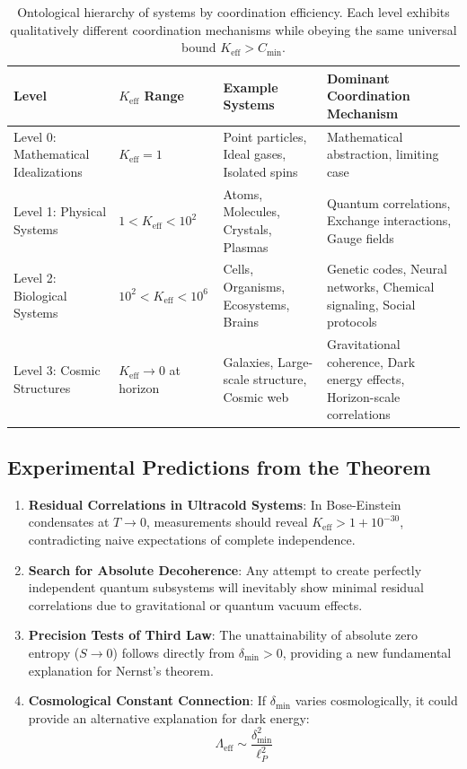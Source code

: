 \documentclass[11pt,a4paper]{article}
\begin{document}
\begin{table}[htbp]
	\centering
	\small
	\begin{tabular}{|p{}|p{}|p{}|p{}|}
		\hline
		\textbf{Level} & \textbf{$K_{\mathrm{eff}}$ Range} & \textbf{Example Systems} & \textbf{Dominant Coordination Mechanism} \\
		\hline
		Level 0: Mathematical Idealizations & $K_{\mathrm{eff}} = 1$ & Point particles, Ideal gases, Isolated spins & Mathematical abstraction, limiting case \\
		\hline
		Level 1: Physical Systems & $1 < K_{\mathrm{eff}} < 10^2$ & Atoms, Molecules, Crystals, Plasmas & Quantum correlations, Exchange interactions, Gauge fields \\
		\hline
		Level 2: Biological Systems & $10^2 < K_{\mathrm{eff}} < 10^6$ & Cells, Organisms, Ecosystems, Brains & Genetic codes, Neural networks, Chemical signaling, Social protocols \\
		\hline
		Level 3: Cosmic Structures & $K_{\mathrm{eff}} \to 0$ at horizon & Galaxies, Large-scale structure, Cosmic web & Gravitational coherence, Dark energy effects, Horizon-scale correlations \\
		\hline
	\end{tabular}
	\caption{Ontological hierarchy of systems by coordination efficiency. Each level exhibits qualitatively different coordination mechanisms while obeying the same universal bound $K_{\mathrm{eff}} > C_{\min}$.}
	\label{tab:ontology-hierarchy}
\end{table}

\subsection{Experimental Predictions from the Theorem}

\begin{enumerate}
	\item \textbf{Residual Correlations in Ultracold Systems}: In Bose-Einstein condensates at $T \to 0$, measurements should reveal $K_{\mathrm{eff}} > 1 + 10^{-30}$, contradicting naive expectations of complete independence.
	
	\item \textbf{Search for Absolute Decoherence}: Any attempt to create perfectly independent quantum subsystems will inevitably show minimal residual correlations due to gravitational or quantum vacuum effects.
	
	\item \textbf{Precision Tests of Third Law}: The unattainability of absolute zero entropy ($S \to 0$) follows directly from $\delta_{\min} > 0$, providing a new fundamental explanation for Nernst's theorem.
	
	\item \textbf{Cosmological Constant Connection}: If $\delta_{\min}$ varies cosmologically, it could provide an alternative explanation for dark energy:
	\begin{equation}
		\Lambda_{\mathrm{eff}} \sim \frac{\delta_{\min}^2}{\ell_P^2}
	\end{equation}
\end{enumerate}
\end{document}
